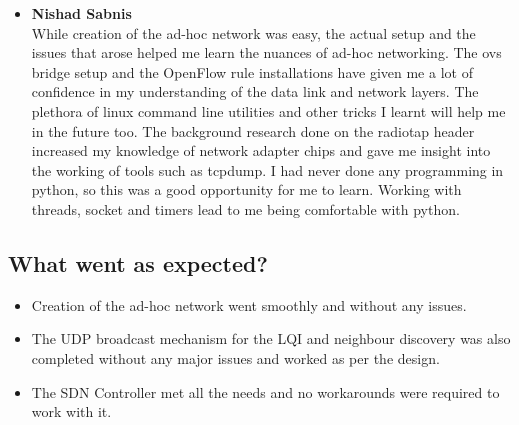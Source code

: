 \documentclass{article}
\begin{document}
\begin{itemize}
\item \textbf{Nishad Sabnis} \\While creation of the ad-hoc network was easy, the actual setup and the issues that arose
helped me learn the nuances of ad-hoc networking. The ovs bridge setup and the OpenFlow rule installations have given me
a lot of confidence in my understanding of the data link and network layers. The plethora of linux command line
utilities and other tricks I learnt will help me in the future too. The background research done on the radiotap header
increased my knowledge of network adapter chips and gave me insight into the working of tools such as tcpdump. I had
never done any programming in python, so this was a good opportunity for me to learn. Working with threads, socket and
timers lead to me being comfortable with python.
\end{itemize}
\subsection{What went as expected?} 
\begin{itemize}
\item Creation of the ad-hoc network went smoothly and without any issues. 
\item The UDP broadcast mechanism for the LQI and neighbour discovery was also completed without any major issues and
worked as per the design. 
\item The SDN Controller met all the needs and no workarounds were required to work with it.
\end{itemize}
\end{document}
